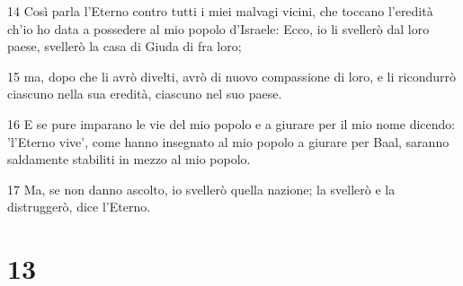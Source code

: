 \par 14 Così parla l'Eterno contro tutti i miei malvagi vicini, che toccano l'eredità ch'io ho data a possedere al mio popolo d'Israele: Ecco, io li svellerò dal loro paese, svellerò la casa di Giuda di fra loro;
\par 15 ma, dopo che li avrò divelti, avrò di nuovo compassione di loro, e li ricondurrò ciascuno nella sua eredità, ciascuno nel suo paese.
\par 16 E se pure imparano le vie del mio popolo e a giurare per il mio nome dicendo: 'l'Eterno vive', come hanno insegnato al mio popolo a giurare per Baal, saranno saldamente stabiliti in mezzo al mio popolo.
\par 17 Ma, se non danno ascolto, io svellerò quella nazione; la svellerò e la distruggerò, dice l'Eterno.

\chapter{13}

